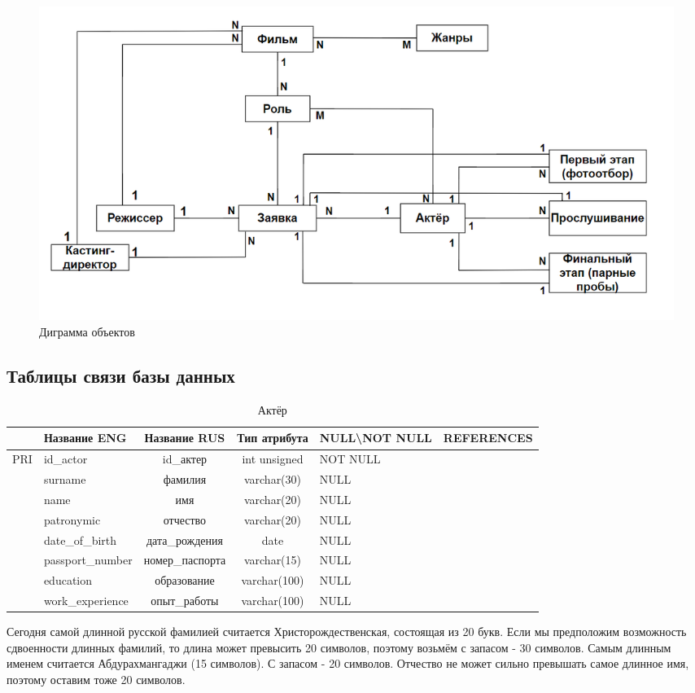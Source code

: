 \documentclass[11pt,a4paper,final]{article} %
\begin{document}
\begin{figure}[H]
	\centering
	\includegraphics[width=1.0\linewidth]{diagram.png}
	\caption{Диграмма объектов}
	\label{fig:diagram}
\end{figure}

\newpage
\setcounter{figure}{4}

\newpage
\subsection{Таблицы связи базы данных}
\vspace{-\baselineskip} 
\begin{table}[H]
	\centering
	\begin{tabular}{|c|p{2.8cm}|c|c|p{2cm}|c|}
		\hline
		& Название ENG & Название RUS & Тип атрибута & NULL\textbackslash \newline NOT NULL & REFERENCES \\
		\hline
		PRI & id\_actor & id\_актер & int unsigned & NOT NULL &  \\
		\hline
		& surname & фамилия & varchar(30) & NULL & \\
		\hline
		& name & имя & varchar(20) & NULL &  \\
		\hline
		& patronymic & отчество & varchar(20) & NULL &  \\
		\hline
		& date\_of\_birth & дата\_рождения & date & NULL &  \\
		\hline
		& passport\_number & номер\_паспорта & varchar(15) & NULL &  \\
		\hline
		& education & образование & varchar(100) & NULL &  \\
		\hline
		& work\_experience & опыт\_работы & varchar(100) & NULL &  \\
		\hline
	\end{tabular}
	\caption{Актёр}
	\label{tab:actor}
\end{table}
\par Сегодня самой длинной русской фамилией считается Христорождественская, состоящая из 20 букв. Если мы предположим возможность сдвоенности длинных фамилий, то длина может превысить 20 символов, поэтому возьмём с запасом - 30 символов. Самым длинным именем считается Абдурахмангаджи (15 символов). С запасом - 20 символов. Отчество не может сильно превышать самое длинное имя, поэтому оставим тоже 20 символов. 
\end{document}
